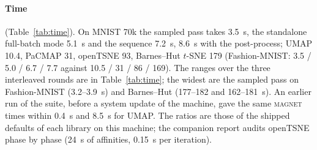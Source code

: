 \documentclass[10pt,twocolumn]{article}
\newcommand{\magnet}{\textsc{magnet}}
\begin{document}
\paragraph{Time} (Table~\ref{tab:time}). On MNIST 70k the sampled pass takes 3.5~s, the standalone full-batch mode
5.1~s and the sequence 7.2~s, 8.6~s with the post-process; UMAP 10.4, PaCMAP 31, openTSNE 93, Barnes--Hut $t$-SNE
179 (Fashion-MNIST: 3.5 / 5.0 / 6.7 / 7.7 against 10.5 / 31 / 86 / 169). The ranges over the three interleaved
rounds are in Table~\ref{tab:time}; the widest are the sampled pass on Fashion-MNIST (3.2--3.9~s) and Barnes--Hut
(177--182 and 162--181~s). An earlier run of the suite, before a system update of the machine, gave the same
\magnet{} times within 0.4~s and 8.5~s for UMAP. The ratios are those
of the shipped defaults of each library on this machine; the companion report audits openTSNE phase by phase
(24~s of affinities, 0.15~s per iteration).

\begin{table}[t]
\centering\footnotesize
\caption{Interleaved timings, seconds, mean (min--max) over three rounds, all threads, graph construction
included, post-process excluded unless stated; fastest in bold, second underlined.}
\label{tab:time}
\resizebox{\columnwidth}{!}{}
\end{table}

\begin{table}[t]
\centering\footnotesize
\caption{Held-out single-cell RNA-seq (\texttt{k47}): raw axes as shipped and the geometric composite as shipped and
with the identical post-process, mean over five runs, every \magnet{} default frozen; references fixed from the
unprocessed runs (Tasic 0.489 / 0.941 / 0.649, PBMC 0.151 / 0.864 / 0.253). Best per column in bold, second
underlined, among the ranked configurations.}
\label{tab:scrna}
\setlength{\tabcolsep}{3pt}
\resizebox{\textwidth}{!}{}
\end{table}
\end{document}
